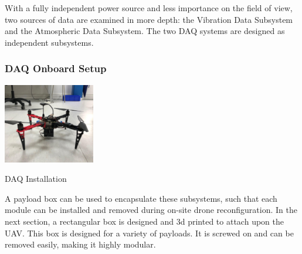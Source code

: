 With a fully independent power source and less importance on the field of view, two sources of data are examined in more depth: the Vibration Data Subsystem and the Atmospheric Data Subsystem. The two DAQ systems are designed as independent subsystems.



\subsubsection{DAQ Onboard Setup}\label{section:daq_modes}

\begin{marginfigure}%
    \raggedright
    \hspace{0.25cm}
    \includegraphics[width=4cm]{images/stage_system/drone_setup.png}
    \caption{DAQ Installation}
    \label{fig:fitting_payload}
\end{marginfigure}

A payload box can be used to encapsulate these subsystems, such that each module can be installed and removed during on-site drone reconfiguration. In the next section, a rectangular box is designed and 3d printed to attach upon the UAV. This box is designed for a variety of payloads. It is screwed on and can be removed easily, making it highly modular.



